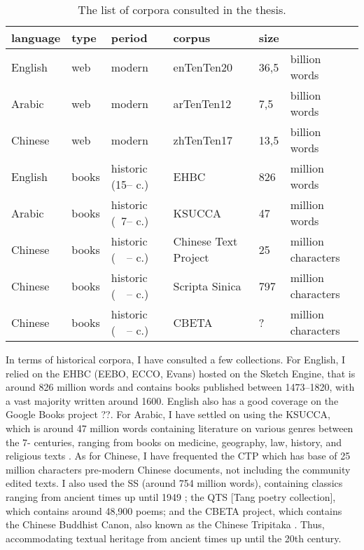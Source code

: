 \begin{table}[]
    \begin{tabularx}{\textwidth}{@{}lllLl@{}l@{}}
    \toprule
    \textbf{language} & \textbf{type} & \textbf{period} &  \textbf{corpus} & \textbf{size} & \\ \midrule
    English           & web      & modern                       & enTenTen20 & 36,5 & billion words    \\
    Arabic            & web      & modern                       & arTenTen12 & 7,5 & billion words    \\
    Chinese           & web      & modern                       & zhTenTen17 & 13,5 & billion words    \\ \midrule
    English           & books    & historic (15-- c.)   & EHBC      & 826   & million words    \\
    Arabic            & books    & historic (~7-- c.)    & KSUCCA    & 47    & million words    \\
    Chinese           & books    & historic (~~-- c.)     & Chinese Text Project    & 25    & million characters \\ 
    Chinese           & books    & historic (~~-- c.)     & Scripta Sinica        & 797   & million characters \\ 
    Chinese           & books    & historic (~~-- c.)     & CBETA        & ?   & million characters \\ 
    \bottomrule
    \end{tabularx}
    \caption[The list of corpora consulted in the thesis.]{The list of corpora consulted in the thesis.}
    \label{table:corpora}
\end{table}

In terms of historical corpora, I have consulted a few collections. For English, I relied on the \gls{EHBC} (EEBO, ECCO, Evans) hosted on the Sketch Engine, that is around 826 million words and contains books published between 1473--1820, with a vast majority written around 1600. English also has a good coverage on the Google Books project ??. For Arabic, I have settled on using the \gls{KSUCCA}, which is around 47 million words containing literature on various genres between the 7- centuries, ranging from books on medicine, geography, law, history, and religious texts \autocite{alrabiah_design_2013,alrabiah_empirical_2014}. As for Chinese, I have frequented the \gls{CTP} \autocite{sturgeon_chinese_nodate,sturgeon_chinese_2021} which has base of 25 million characters pre-modern Chinese documents, not including the community edited texts. I also used the \gls{SS} (around 754 million words), containing classics ranging from ancient times up until 1949 \autocite{academia_sinica_scripta_1993}; the \gls{QTS} [Tang poetry collection], which contains around 48,900 poems; and the \gls{CBETA} project, which contains the Chinese Buddhist Canon, also known as the Chinese Tripitaka \autocite[365-386]{chen_buddhism_1964}. Thus, accommodating textual heritage from ancient times up until the 20th century.

